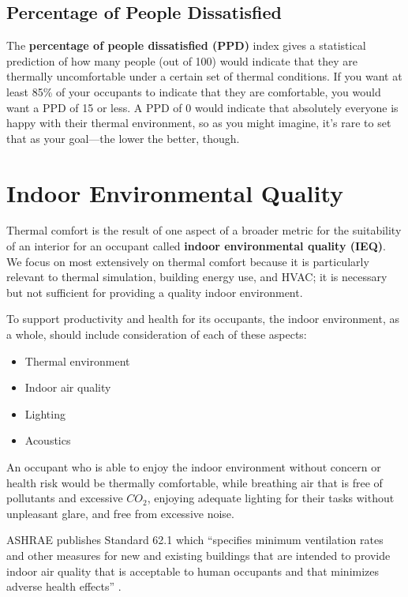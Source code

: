 \documentclass[10pt]{article}
\begin{document}
\subsection{Percentage of People Dissatisfied}

The \textbf{percentage of people dissatisfied (PPD)} index gives a statistical prediction of how many people (out of 100) would indicate that they are thermally uncomfortable under a certain set of thermal conditions. If you want at least 85\% of your occupants to indicate that they are comfortable, you would want a PPD of 15 or less. A PPD of 0 would indicate that absolutely everyone is happy with their thermal environment, so as you might imagine, it's rare to set that as your goal---the lower the better, though.

\section{Indoor Environmental Quality}

Thermal comfort is the result of one aspect of a broader metric for the suitability of an interior for an occupant called \textbf{indoor environmental quality (IEQ)}. We focus on most extensively on thermal comfort because it is particularly relevant to thermal simulation, building energy use, and HVAC; it is necessary but not sufficient for providing a quality indoor environment.

To support productivity and health for its occupants, the indoor environment, as a whole, should include consideration of each of these aspects:

\vspace{-6pt}
\begin{itemize}
    \setlength{\itemsep}{0pt}%
    \setlength{\parskip}{0pt}%
    \item Thermal environment
    \item Indoor air quality
    \item Lighting
    \item Acoustics
\end{itemize}
\vspace{-6pt}

An occupant who is able to enjoy the indoor environment without concern or health risk would be thermally comfortable, while breathing air that is free of pollutants and excessive $CO_2$, enjoying adequate lighting for their tasks without unpleasant glare, and free from excessive noise.

ASHRAE publishes Standard 62.1 which ``specifies minimum ventilation rates and other measures for new and existing
buildings that are intended to provide indoor air quality that is acceptable to human occupants and that minimizes adverse health effects'' \cite{noauthor_undated-st}.
\end{document}
